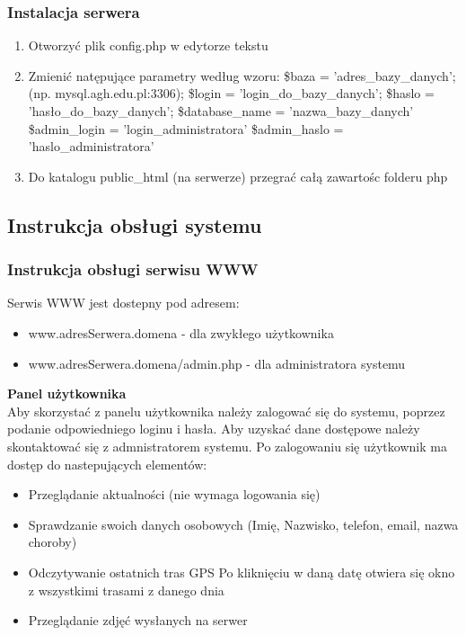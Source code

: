 \documentclass[11pt,a4paper]{article}
\begin{document}
\subsubsection{Instalacja serwera}
\begin{enumerate}
\item Otworzyć plik config.php w edytorze tekstu
\item Zmienić natępujące parametry według wzoru:
\subitem \$baza = 'adres\_bazy\_danych';  (np. mysql.agh.edu.pl:3306);
\subitem \$login = 'login\_do\_bazy\_danych'; 
\subitem \$haslo = 'hasło\_do\_bazy\_danych';
\subitem \$database\_name = 'nazwa\_bazy\_danych'
\subitem \$admin\_login = 'login\_administratora'
\subitem \$admin\_haslo = 'haslo\_administratora'
\item Do katalogu public\_html (na serwerze) przegrać całą zawartośc folderu php
\end{enumerate}

\subsection{Instrukcja obsługi systemu}
\subsubsection{Instrukcja obsługi serwisu WWW}

Serwis WWW jest dostepny pod adresem:
\begin{itemize}
\item www.adresSerwera.domena - dla zwykłego użytkownika 
\item www.adresSerwera.domena/admin.php - dla administratora systemu
\end{itemize}

{\bf Panel użytkownika}\\
Aby skorzystać z panelu użytkownika należy zalogować się do systemu, poprzez podanie odpowiedniego loginu i hasła.
Aby uzyskać dane dostępowe należy skontaktować się z admnistratorem systemu.
Po zalogowaniu się użytkownik ma dostęp do nastepujących elementów:
\begin{itemize}
\item Przeglądanie aktualności (nie wymaga logowania się)
\item Sprawdzanie swoich danych osobowych (Imię, Nazwisko, telefon, email, nazwa choroby)
\item Odczytywanie ostatnich tras GPS 
\subitem Po kliknięciu w daną datę otwiera się okno z wszystkimi trasami z danego dnia
\item Przeglądanie zdjęć wysłanych na serwer
\end{itemize}
\end{document}
